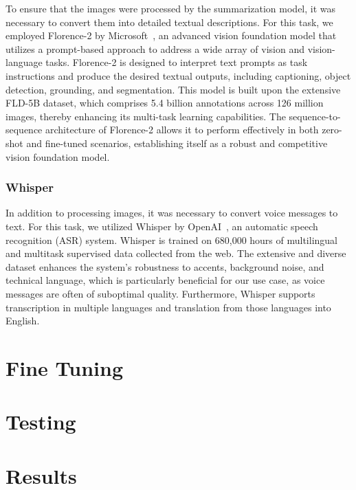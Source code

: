 \documentclass[10pt,twocolumn,letterpaper]{article}
\begin{document}
To ensure that the images were processed by the summarization model, it was necessary to convert them into detailed textual descriptions. 
For this task, we employed Florence-2 by Microsoft~\cite{xiao2023florence2advancingunifiedrepresentation}, an advanced vision foundation model that utilizes a prompt-based approach to address a wide array of vision and vision-language tasks. 
Florence-2 is designed to interpret text prompts as task instructions and produce the desired textual outputs, including captioning, object detection, grounding, and segmentation. 
This model is built upon the extensive FLD-5B dataset, which comprises 5.4 billion annotations across 126 million images, thereby enhancing its multi-task learning capabilities. 
The sequence-to-sequence architecture of Florence-2 allows it to perform effectively in both zero-shot and fine-tuned scenarios, establishing itself as a robust and competitive vision foundation model.

\subsubsection{Whisper}

In addition to processing images, it was necessary to convert voice messages to text. 
For this task, we utilized Whisper by OpenAI~\cite{radford2022robustspeechrecognitionlargescale}, an automatic speech recognition (ASR) system. 
Whisper is trained on 680,000 hours of multilingual and multitask supervised data collected from the web. 
The extensive and diverse dataset enhances the system's robustness to accents, background noise, and technical language, which is particularly beneficial for our use case, as voice messages are often of suboptimal quality. 
Furthermore, Whisper supports transcription in multiple languages and translation from those languages into English.

\section{Fine Tuning}

\section{Testing}

\section{Results}
\end{document}

